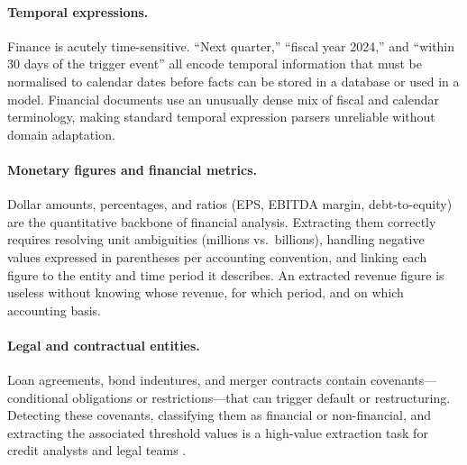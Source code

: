 \paragraph*{Temporal expressions.} Finance is acutely time-sensitive. ``Next quarter,''
``fiscal year 2024,'' and ``within 30 days of the trigger event'' all encode temporal
information that must be normalised to calendar dates before facts can be stored in a
database or used in a model. Financial documents use an unusually dense mix of fiscal
and calendar terminology, making standard temporal expression parsers unreliable without
domain adaptation.

\paragraph*{Monetary figures and financial metrics.} Dollar amounts, percentages, and
ratios (EPS, EBITDA margin, debt-to-equity) are the quantitative backbone of financial
analysis. Extracting them correctly requires resolving unit ambiguities (millions vs.\
billions), handling negative values expressed in parentheses per accounting convention,
and linking each figure to the entity and time period it describes. An extracted revenue
figure is useless without knowing whose revenue, for which period, and on which accounting
basis.

\paragraph*{Legal and contractual entities.} Loan agreements, bond indentures, and
merger contracts contain covenants---conditional obligations or restrictions---that can
trigger default or restructuring. Detecting these covenants, classifying them as
financial or non-financial, and extracting the associated threshold values is a
high-value extraction task for credit analysts and legal teams \cite{frattaroli2019}.

